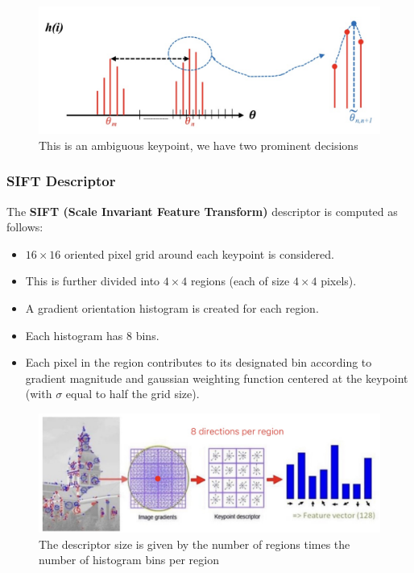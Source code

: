\begin{figure}[htbp]
  \centering
  \includegraphics[width=0.7\linewidth]{./img/ambiguous_keypoint.jpg}
  \caption{This is an ambiguous keypoint, we have two prominent decisions}
  \label{fig:ambiguous_keypoints}
\end{figure}

\subsubsection{SIFT Descriptor}

The \textbf{SIFT (Scale Invariant Feature Transform)} descriptor is computed as follows:
\begin{itemize}
  \item $16\times 16$ oriented pixel grid around each keypoint is considered.
  \item This is further divided into $4 \times 4$ regions (each of size $4\times4$ pixels).
  \item A gradient orientation histogram is created for each region.
  \item Each histogram has 8 bins.
  \item Each pixel in the region contributes to its designated bin according to gradient magnitude and gaussian weighting function centered at the keypoint (with $\sigma$ equal to half the grid size).
\end{itemize}

\begin{figure}[htbp]
  \centering
  \includegraphics[width=0.8\linewidth]{./img/sift_descriptor.jpg}
  \caption{The descriptor size is given by the number of regions times the number of histogram bins per region}
  \label{fig:sift_descriptor}
\end{figure}

